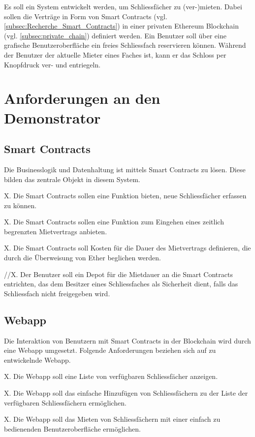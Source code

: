 Es soll ein System entwickelt werden, um Schliessfächer zu (ver-)mieten. Dabei sollen die Verträge in Form von Smart Contracts (vgl. \ref{subsec:Recherche_Smart_Contracts}) in einer privaten Ethereum Blockchain (vgl. \ref{subsec:private_chain}) definiert werden. Ein Benutzer soll über eine grafische Benutzeroberfläche ein freies Schliessfach reservieren können. Während der Benutzer der aktuelle Mieter eines Faches ist, kann er das Schloss per Knopfdruck ver- und entriegeln.

\section{Anforderungen an den Demonstrator}
\label{sec:Anforderungen_Demonstrator}

\subsection{Smart Contracts}
Die Businesslogik und Datenhaltung ist mittels Smart Contracts zu lösen. Diese bilden das zentrale Objekt in diesem System.

X. Die Smart Contracts sollen eine Funktion bieten, neue Schliessfächer erfassen zu können.

X. Die Smart Contracts sollen eine Funktion zum Eingehen eines zeitlich begrenzten Mietvertrags anbieten.

X. Die Smart Contracts soll Kosten für die Dauer des Mietvertrags definieren, die durch die Überweisung von Ether beglichen werden.

//X. Der Benutzer soll ein Depot für die Mietdauer an die Smart Contracts entrichten, das dem Besitzer eines Schliessfaches als Sicherheit dient, falls das Schliessfach nicht freigegeben wird.

\subsection{Webapp}
Die Interaktion von Benutzern mit Smart Contracts in der Blockchain wird durch eine Webapp umgesetzt. Folgende Anforderungen beziehen sich auf zu entwickelnde Webapp.\cite[Wiki/DAPP-Developer-Resources, Wiki/Useful-Dapp-Patterns]{github.com/ethereum}

X. Die Webapp soll eine Liste von verfügbaren Schliessfächer anzeigen.

X. Die Webapp soll das einfache Hinzufügen von Schliessfächern zu der Liste der verfügbaren Schliessfächern ermöglichen.

X. Die Webapp soll das Mieten von Schliessfächern mit einer einfach zu bedienenden Benutzeroberfläche ermöglichen.

